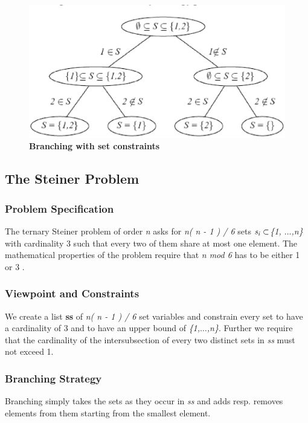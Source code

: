\documentclass[a4paper]{scrartcl}
\begin{document}
\begin{figure}[htpb]
\centerline{\includegraphics*[scale=0.8]{figs2/setdistribution.eps}}
\caption{{\bf Branching with set constraints}}
\label{figure 12}
\end{figure}





\newpage
\subsection{The Steiner Problem}
\subsubsection{Problem Specification}
The ternary Steiner problem of order {\it n} asks for 
{\it n( n - 1 ) / 6} sets ${\it s_i \subset} ${\it \{1,
$\ldots$,n\}} with cardinality 3 such that every two of them share 
at most one element. The mathematical properties of 
the problem require that {\it n mod 6} has to be either 1 or 3 
\cite{11}.

\subsubsection{Viewpoint and Constraints}
We create a list {\bf ss} of {\it n( n - 1 ) / 6} set variables 
and constrain every set to have a cardinality of 3 and to have an 
upper bound of {\it \{1,$\ldots$,n\}}. Further we require that the cardinality 
of the intersubsection of every two distinct sets in {\it ss} must 
not exceed 1. 

\subsubsection{Branching Strategy}
Branching simply takes the sets as they occur in {\it ss} 
and adds resp. removes elements from them starting from 
the smallest element. 
\end{document}
